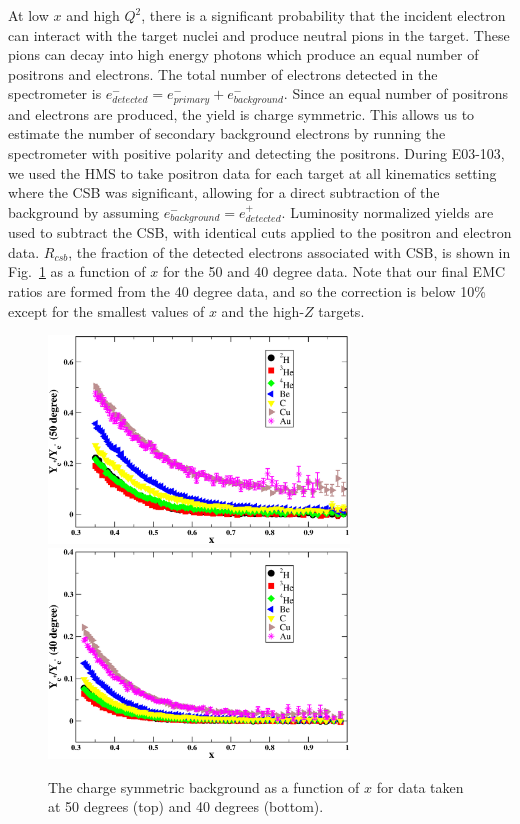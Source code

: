 At low $x$ and high $Q^2$, there is a significant probability that the
incident electron can interact with the target nuclei and produce neutral
pions in the target. These pions can decay into high energy photons which
produce an equal number of positrons and electrons. The total number of
electrons detected in the spectrometer is $e^-_{detected} = e^-_{primary} +
e^-_{background}$. Since an equal number of positrons and electrons are
produced, the yield is charge symmetric. This allows us to estimate the number
of secondary background electrons by running the spectrometer with positive
polarity and detecting the positrons. During E03-103, we used the HMS to take
positron data for each target at all kinematics setting where the CSB was
significant, allowing for a direct subtraction of the background by assuming
$e^-_{background} =e^+_{detected}$.  Luminosity normalized yields are used
to subtract the CSB, with identical cuts applied to the positron and electron
data.
%
%
%
$R_{csb}$, the fraction of the detected electrons associated with CSB,
is shown in Fig.~\ref{csbg_fig} as a function of $x$ for the 50 and 40 degree
data. Note that our final EMC ratios are formed from the 40 degree data, and
so the correction is below 10\% except for the smallest values of $x$ and the
high-$Z$ targets.

\begin{figure}[htb]
\begin{center}
\includegraphics[width=80mm,angle=0]{plots/50deg_csbg_mod.eps}
\includegraphics[width=80mm,angle=0]{plots/40deg_csbg_mod.eps}
\caption{The charge symmetric background as a function of $x$ for data taken
at 50 degrees (top) and 40 degrees (bottom).
\label{csbg_fig}}
\end{center}
\end{figure}

